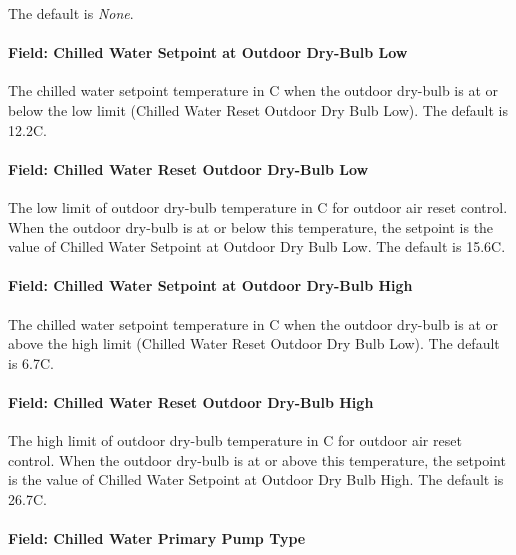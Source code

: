 The default is \emph{None}.

\paragraph{Field: Chilled Water Setpoint at Outdoor Dry-Bulb Low}\label{field-chilled-water-setpoint-at-outdoor-dry-bulb-low}

The chilled water setpoint temperature in C when the outdoor dry-bulb is at or below the low limit (Chilled Water Reset Outdoor Dry Bulb Low). The default is 12.2C.

\paragraph{Field: Chilled Water Reset Outdoor Dry-Bulb Low}\label{field-chilled-water-reset-outdoor-dry-bulb-low}

The low limit of outdoor dry-bulb temperature in C for outdoor air reset control. When the outdoor dry-bulb is at or below this temperature, the setpoint is the value of Chilled Water Setpoint at Outdoor Dry Bulb Low. The default is 15.6C.

\paragraph{Field: Chilled Water Setpoint at Outdoor Dry-Bulb High}\label{field-chilled-water-setpoint-at-outdoor-dry-bulb-high}

The chilled water setpoint temperature in C when the outdoor dry-bulb is at or above the high limit (Chilled Water Reset Outdoor Dry Bulb Low). The default is 6.7C.

\paragraph{Field: Chilled Water Reset Outdoor Dry-Bulb High}\label{field-chilled-water-reset-outdoor-dry-bulb-high}

The high limit of outdoor dry-bulb temperature in C for outdoor air reset control. When the outdoor dry-bulb is at or above this temperature, the setpoint is the value of Chilled Water Setpoint at Outdoor Dry Bulb High. The default is 26.7C.

\paragraph{Field: Chilled Water Primary Pump Type}\label{field-chilled-water-primary-pump-type}

